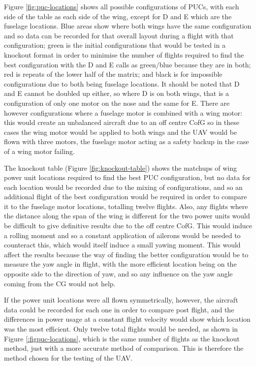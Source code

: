 \documentclass[../../main.tex]{subfiles}
\begin{document}
Figure \ref{fig:puc-locations} shows all possible configurations of PUCs, with each side of the table as each side of the wing, except for D and E which are the fuselage locations.
Blue areas show where both wings have the same configuration and so data can be recorded for that overall layout during a flight with that configuration; green is the initial configurations that would be tested in a knockout format in order to minimise the number of flights required to find the best configuration with the D and E calls as green/blue because they are in both; red is repeats of the lower half of the matrix; and black is for impossible configurations due to both being fuselage locations.
It should be noted that D and E cannot be doubled up either, so where D is on both wings, that is a configuration of only one motor on the nose and the same for E.
There are however configurations where a fuselage motor is combined with a wing motor: this would create an unbalanced aircraft due to an off centre CofG so in these cases the wing motor would be applied to both wings and the UAV would be flown with three motors, the fuselage motor acting as a safety backup in the case of a wing motor failing.


The knockout table (Figure \ref{fig:knockout-table}) shows the matchups of wing power unit locations required to find the best PUC configuration, but no data for each location would be recorded due to the mixing of configurations, and so an additional flight of the best configuration would be required in order to compare it to the fuselage motor locations, totalling twelve flights.
Also, any flights where the distance along the span of the wing is different for the two power units would be difficult to give definitive results due to the off centre CofG.
This would induce a rolling moment and so a constant application of ailerons would be needed to counteract this, which would itself induce a small yawing moment.
This would affect the results because the way of finding the better configuration would be to measure the yaw angle in flight, with the more efficient location being on the opposite side to the direction of yaw, and so any influence on the yaw angle coming from the CG would not help. 

If the power unit locations were all flown symmetrically, however, the aircraft data could be recorded for each one in order to compare post flight, and the differences in power usage at a constant flight velocity would show which location was the most efficient.
Only twelve total flights would be needed, as shown in Figure \ref{:figpuc-locations}, which is the same number of flights as the knockout method, just with a more accurate method of comparison.
This is therefore the method chosen for the testing of the UAV.
\end{document}
